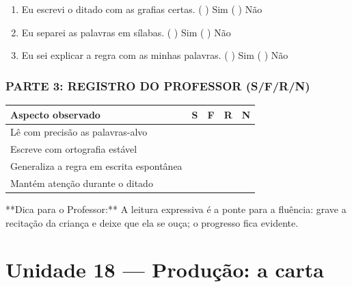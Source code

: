 \begin{exercicio}
\begin{enumerate}[label=\alph*)]
  \item Eu escrevi o ditado com as grafias certas.  \quad ( ) Sim   ( ) Não

  \item Eu separei as palavras em sílabas.  \quad ( ) Sim   ( ) Não

  \item Eu sei explicar a regra com as minhas palavras.  \quad ( ) Sim   ( ) Não

\end{enumerate}

\subsection*{PARTE 3: REGISTRO DO PROFESSOR (S/F/R/N)}

\begin{center}
\renewcommand{\arraystretch}{1.4}
\begin{tabular}{@{}p{9cm}cccc@{}}
\toprule
Aspecto observado & S & F & R & N \\
\midrule
Lê com precisão as palavras-alvo & & & & \\
Escreve com ortografia estável & & & & \\
Generaliza a regra em escrita espontânea & & & & \\
Mantém atenção durante o ditado & & & & \\
\bottomrule\end{tabular}\end{center}

\end{exercicio}

\begin{dica}
**Dica para o Professor:** A leitura expressiva é a ponte para a fluência: grave a recitação da criança e deixe que ela se ouça; o progresso fica evidente.
\end{dica}


\chapter{Unidade 18 --- Produção: a carta}


